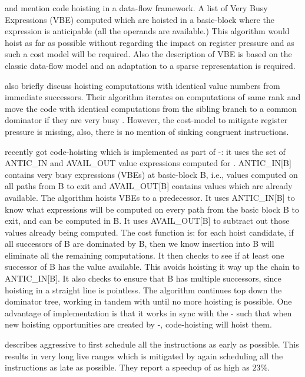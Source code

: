 \documentclass[sigplan,10pt,review,anonymous]{acmart}\settopmatter{printfolios=true,printccs=false,printacmref=false}
\begin{document}
\citet{dhamdhere1988fast} and \citet{steven1997advanced} mention
code hoisting in a data-flow framework. A list of Very Busy Expressions (VBE)
computed which are hoisted in a basic-block where the expression is
anticipable (all the operands are available.) This algorithm would hoist as far
as possible without regarding the impact on register pressure and as such a cost
model will be required.  Also the description of VBE is based on the classic
data-flow model and an adaptation to a sparse \SSA{} representation is required.

\citet{rosen1988global} also briefly discuss hoisting computations with
identical value numbers from immediate successors. Their algorithm iterates on
computations of same rank and move the code with identical computations from the
sibling branch to a common dominator if they are very busy
\cite{steven1997advanced}. However, the cost-model to mitigate register pressure
is missing, also, there is no mention of sinking congruent instructions.

\GCC{} recently got code-hoisting \cite{GCCCodeHoisting} which is implemented as
part of \GVN{}-\PRE{}: it uses the set of ANTIC\_IN and AVAIL\_OUT value
expressions computed for \PRE{}. ANTIC\_IN[B] contains very busy expressions
(VBEs) at basic-block B, i.e., values computed on all paths from B to exit and
AVAIL\_OUT[B] contains values which are already available. The algorithm hoists
VBEs to a predecessor.  It uses ANTIC\_IN[B] to know what expressions will be
computed on every path from the basic block B to exit, and can be computed in B.
It uses AVAIL\_OUT[B] to subtract out those values already being computed.  The
cost function is: for each hoist candidate, if all successors of B are dominated
by B, then we know insertion into B will eliminate all the remaining
computations.  It then checks to see if at least one successor of B has the
value available.  This avoids hoisting it way up the chain to ANTIC\_IN[B].  It
also checks to ensure that B has multiple successors, since hoisting in a
straight line is pointless.  The algorithm continues top down the dominator
tree, working in tandem with \PRE{} until no more hoisting is possible.  One
advantage of \GCC{} implementation is that it works in sync with the
\GVN{}-\PRE{} such that when new hoisting opportunities are created by
\GVN{}-\PRE{}, code-hoisting will hoist them.

\citet{click1995global} describes aggressive \gcm{} to first
schedule all the instructions as early as possible. This results in very long
live ranges which is mitigated by again scheduling all the instructions as late
as possible. They report a speedup of as high as $23\%$.
\end{document}

